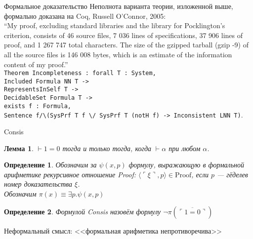 \documentclass[aspectratio=169]{beamer}
\newtheorem{dfn}{Определение}[section]
\newtheorem{lmm}{Лемма}[section]
\begin{document}
\begin{frame}{Формальное доказательство}
Неполнота варианта теории, изложенной выше, формально доказана на Coq, Russell O'Connor, 2005:\\
\vspace{0.5cm}
``My proof, excluding standard libraries and the library for Pocklington’s criterion, 
consists of 46 source files, 7 036 lines of specifications, 37 906 lines of proof, 
and 1 267 747 total characters. The size of the gzipped tarball (gzip -9) of all 
the source files is 146 008 bytes, which is an estimate of the information content of my proof.''\\
\vspace{0.5cm}
\texttt{Theorem Incompleteness : forall T : System,}\\
\hspace{0.5cm}\texttt{Included Formula NN T ->}\\
\hspace{0.5cm}\texttt{RepresentsInSelf T ->}\\
\hspace{0.5cm}\texttt{DecidableSet Formula T ->}\\
\hspace{0.5cm}\texttt{exists f : Formula,}\\
\hspace{0.5cm}\texttt{Sentence f/\textbackslash (SysPrf T f \textbackslash/ SysPrf T (notH f) -> Inconsistent LNN T)}.
\end{frame}

\begin{frame}{Consis}
\begin{lmm}
$\vdash 1=0$ тогда и только тогда, когда $\vdash\alpha$ при любом $\alpha$.
\end{lmm}
\begin{dfn}
Обозначим за $\psi(x,p)$ формулу, выражающую в формальной арифметике рекурсивное
отношение Proof: $\langle \ulcorner\xi\urcorner,p\rangle \in \text{Proof}$, если $p$ --- гёделев номер
доказательства $\xi$. \pause\\
Обозначим $\pi(x)\equiv\exists p.\psi(x,p)$
\end{dfn} \pause
\begin{dfn}Формулой Consis назовём формулу
$\neg \pi(\overline{\ulcorner 1=0 \urcorner})$
\end{dfn} \pause
Неформальный смысл: <<формальная арифметика непротиворечива>>
\end{frame}
\end{document}
